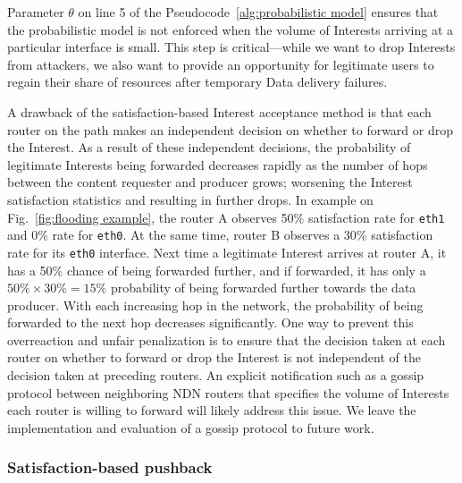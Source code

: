 Parameter $\theta$ on line 5 of the Pseudocode~\ref{alg:probabilistic model} ensures that the probabilistic model is not enforced when the volume of Interests arriving at a particular interface is small. This step is critical---while we want to drop Interests from attackers, we also want to provide an opportunity for legitimate users to regain their share of resources after temporary Data delivery failures.

A drawback of the satisfaction-based Interest acceptance method is that each router on the path makes an independent decision on whether to forward or drop the Interest. 
As a result of these independent decisions,  the probability of legitimate Interests being forwarded decreases rapidly as the number of hops between the content requester and producer grows; worsening the Interest satisfaction statistics and resulting in further drops.
In example on Fig.~\ref{fig:flooding example}, the router A observes 50\% satisfaction rate for \texttt{eth1} and 0\% rate for \texttt{eth0}. 
At the same time, router B observes a 30\% satisfaction rate for its \texttt{eth0} interface.
Next time a legitimate Interest arrives at router A, it has a 50\% chance of being forwarded further, and if forwarded, it has only a $50\% \times 30\% = 15\%$ probability of being forwarded further towards the data producer. With each increasing hop in the network, the probability of being forwarded to the next hop decreases significantly. 
One way to prevent this overreaction and unfair penalization is to ensure that the decision taken at each router on whether to forward or drop the Interest is not independent of the decision taken at preceding routers. An explicit notification such as a gossip protocol between neighboring NDN routers that specifies the volume of Interests each router is willing to forward will likely address this issue. We leave the implementation and evaluation of a gossip protocol to future work.


\subsubsection{\textbf{Satisfaction-based pushback}}
\label{sec:dynamic limits}


